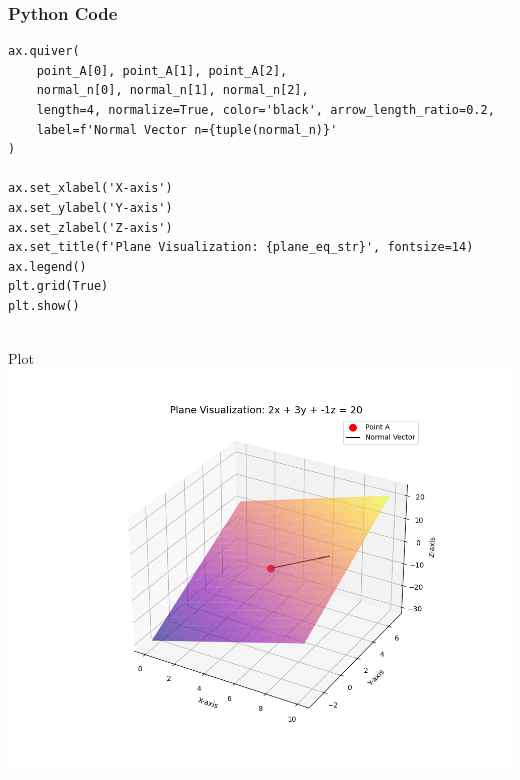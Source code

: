 \documentclass{beamer}
\begin{document}
\begin{frame}[fragile]
    \frametitle{Python Code}
    \begin{lstlisting}
ax.quiver(
    point_A[0], point_A[1], point_A[2],
    normal_n[0], normal_n[1], normal_n[2],
    length=4, normalize=True, color='black', arrow_length_ratio=0.2,
    label=f'Normal Vector n={tuple(normal_n)}'
)

ax.set_xlabel('X-axis')
ax.set_ylabel('Y-axis')
ax.set_zlabel('Z-axis')
ax.set_title(f'Plane Visualization: {plane_eq_str}', fontsize=14)
ax.legend()
plt.grid(True)
plt.show()
   
    \end{lstlisting}
\end{frame}
\begin{frame}{Plot}
    \centering
    \includegraphics[width=\columnwidth, height=0.9\textheight, keepaspectratio]{figs/fig4.png}     
\end{frame}
\end{document}
